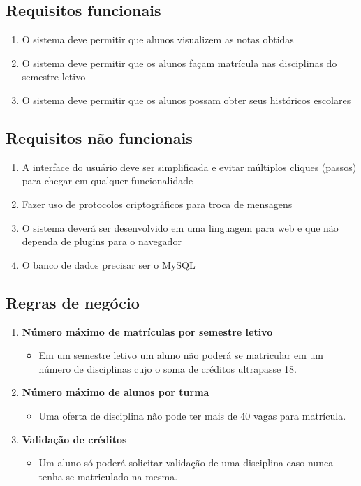 \documentclass[11pt]{../../classes/univaliarticle}
\begin{document}
\lipsum[2]


\subsection{Requisitos funcionais}
\label{sec:reqfuncionais}

\begin{enumerate}
    \item O sistema deve permitir que alunos visualizem as notas obtidas
    \item O sistema deve permitir que os alunos façam matrícula nas disciplinas do semestre letivo
    \item O sistema deve permitir que os alunos possam obter seus históricos escolares
\end{enumerate}

\subsection{Requisitos não funcionais}
\label{sec:reqnaofuncionais}

\begin{enumerate}
    \item A interface do usuário deve ser simplificada e evitar múltiplos cliques (passos) para chegar em qualquer funcionalidade
    \item Fazer uso de protocolos criptográficos para troca de mensagens
    \item O sistema deverá ser desenvolvido em uma linguagem para web e que não dependa de plugins para o navegador
    \item O banco de dados precisar ser o MySQL
\end{enumerate}

\subsection{Regras de negócio}
\label{sec:regrasdenegocio}

\begin{enumerate}
    \item \textbf{Número máximo de matrículas por semestre letivo}
          \begin{itemize}
              \item Em um semestre letivo um aluno não poderá se matricular em um número de disciplinas cujo o soma de créditos ultrapasse 18.
          \end{itemize}
    \item \textbf{Número máximo de alunos por turma}
          \begin{itemize}
              \item Uma oferta de disciplina não pode ter mais de 40 vagas para matrícula.
          \end{itemize}
    \item \textbf{Validação de créditos}
          \begin{itemize}
              \item Um aluno só poderá solicitar validação de uma disciplina caso nunca tenha se matriculado na mesma.
          \end{itemize}
\end{enumerate}
\end{document}
